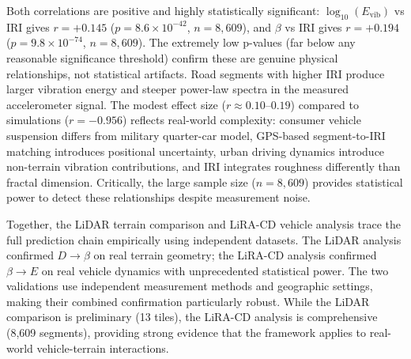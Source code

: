 \documentclass[11pt]{article}
\begin{document}
Both correlations are positive and highly statistically significant: $\log_{10}(E_{\mathrm{vib}})$ vs IRI gives $r = +0.145$ ($p = 8.6 \times 10^{-42}$, $n = 8{,}609$), and $\beta$ vs IRI gives $r = +0.194$ ($p = 9.8 \times 10^{-74}$, $n = 8{,}609$). The extremely low p-values (far below any reasonable significance threshold) confirm these are genuine physical relationships, not statistical artifacts. Road segments with higher IRI produce larger vibration energy and steeper power-law spectra in the measured accelerometer signal. The modest effect size ($r \approx 0.10$--$0.19$) compared to simulations ($r = -0.956$) reflects real-world complexity: consumer vehicle suspension differs from military quarter-car model, GPS-based segment-to-IRI matching introduces positional uncertainty, urban driving dynamics introduce non-terrain vibration contributions, and IRI integrates roughness differently than fractal dimension. Critically, the large sample size ($n = 8{,}609$) provides statistical power to detect these relationships despite measurement noise.

Together, the LiDAR terrain comparison and LiRA-CD vehicle analysis trace the full prediction chain empirically using independent datasets. The LiDAR analysis confirmed $D \rightarrow \beta$ on real terrain geometry; the LiRA-CD analysis confirmed $\beta \rightarrow E$ on real vehicle dynamics with unprecedented statistical power. The two validations use independent measurement methods and geographic settings, making their combined confirmation particularly robust. While the LiDAR comparison is preliminary (13 tiles), the LiRA-CD analysis is comprehensive (8,609 segments), providing strong evidence that the framework applies to real-world vehicle-terrain interactions.
\end{document}
